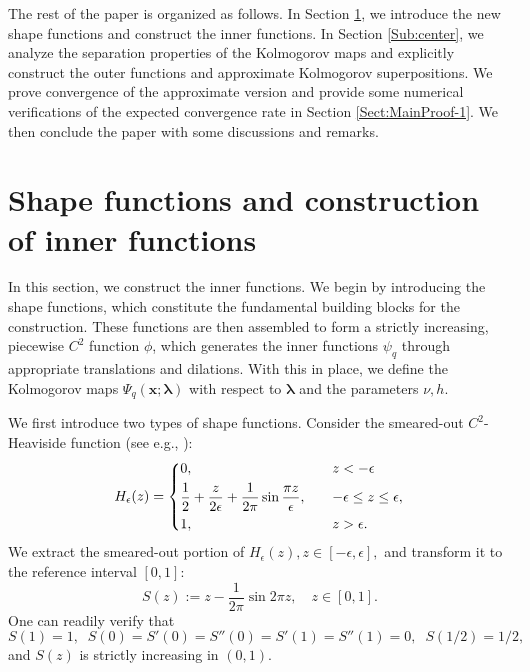 \documentclass[10pt,reqno,final]{amsart}
\theoremstyle{remark}
\theoremstyle{definition}
\newcommand{\bs}[1]{\boldsymbol{#1}}
\begin{document}
The rest of the paper is organized as follows. In Section \ref{Sect2}, we introduce the new shape functions and construct the inner functions.  In Section \ref{Sub:center}, we analyze the separation properties of the Kolmogorov maps and explicitly construct the outer functions and approximate  
Kolmogorov superpositions. We prove  
 convergence of the approximate version and provide some numerical verifications of the expected convergence rate in  Section   
\ref{Sect:MainProof-1}.  We then conclude the paper with some discussions and remarks. 





\section{Shape functions and construction of inner functions}\label{Sect2}
\setcounter{equation}{0}
\setcounter{lmm}{0}
\setcounter{thm}{0}

In this section, we construct the inner functions. We begin by introducing the shape functions, which constitute the fundamental building blocks for the construction.  These functions are then assembled to form a strictly increasing, piecewise $C^2$ function $\phi$, which generates the inner functions $\psi_q$ through appropriate translations and dilations. 
 With this in place, we define the Kolmogorov maps \(\Psi_q(\bs{x}; \bs{\lambda})\)
 with respect to  \(\bs{\lambda}\) and the parameters $\nu, h.$
 

\smallskip

We first introduce two types of shape functions.
Consider the smeared-out $C^2$-Heaviside function (see e.g., \cite[(1.22)]{Osher2003}):  \begin{equation*}\label{HeavideA}
    H_\epsilon(z)=
\begin{dcases}0, & z< -\epsilon \\
\frac{1}{2}+\frac{z}{2\epsilon}+\frac{1}{2\pi}\sin\frac{\pi z}{\epsilon},\quad  &-\epsilon \le z \le \epsilon,\\
1, & z> \epsilon.
\end{dcases}
\end{equation*}
We  extract  the smeared-out portion of $H_\epsilon(z), z\in [-\epsilon,\epsilon],$ and transform it to the reference interval $[0,1]:$
\begin{equation}\label{St}
    S(z):=z-\frac{1}{2\pi} \sin{2\pi z},\quad z\in [0,1].
\end{equation}
One can readily verify that
\begin{equation}\label{sproperty}
     S(1)=1,\;\; S(0)=S'(0)=S''(0)=S'(1)=S''(1)=0,\;\; S(1/2)=1/2,
\end{equation}
and $S(z)$ is strictly  increasing in $(0,1)$. 
\end{document}
